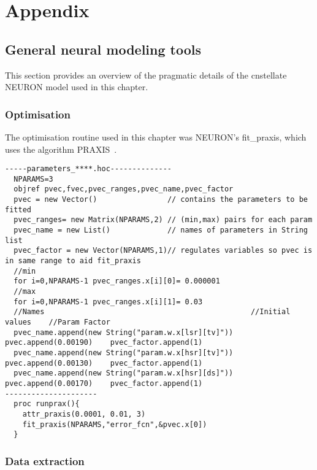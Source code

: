 
\section{Appendix    \label{sec:ch3:appendix}}

\subsection{General neural modeling tools}

This section provides an overview of the pragmatic details of the \textsf{cnstellate} NEURON model used in this chapter.

\subsubsection{Optimisation}

The optimisation routine used in this chapter was NEURON's \textsf{fit\_praxis},
which uses the algorithm PRAXIS~\citep{Brent:1976}.

\begin{lstlisting}[label=lbl:runprax,caption=Set optimisation attributes and run fitting procedure.]
-----parameters_****.hoc--------------
  NPARAMS=3
  objref pvec,fvec,pvec_ranges,pvec_name,pvec_factor
  pvec = new Vector()                // contains the parameters to be fitted
  pvec_ranges= new Matrix(NPARAMS,2) // (min,max) pairs for each param
  pvec_name = new List()             // names of parameters in String list
  pvec_factor = new Vector(NPARAMS,1)// regulates variables so pvec is in same range to aid fit_praxis
  //min
  for i=0,NPARAMS-1 pvec_ranges.x[i][0]= 0.000001
  //max
  for i=0,NPARAMS-1 pvec_ranges.x[i][1]= 0.03
  //Names                                               //Initial values	//Param Factor
  pvec_name.append(new String("param.w.x[lsr][tv]"))	pvec.append(0.00190)	pvec_factor.append(1)
  pvec_name.append(new String("param.w.x[hsr][tv]"))	pvec.append(0.00130)	pvec_factor.append(1)
  pvec_name.append(new String("param.w.x[hsr][ds]"))	pvec.append(0.00170)	pvec_factor.append(1)
---------------------
  proc runprax(){
    attr_praxis(0.0001, 0.01, 3)
    fit_praxis(NPARAMS,"error_fcn",&pvec.x[0])
  }
\end{lstlisting}


\subsubsection{Data extraction    \label{sec:data-extraction}}

